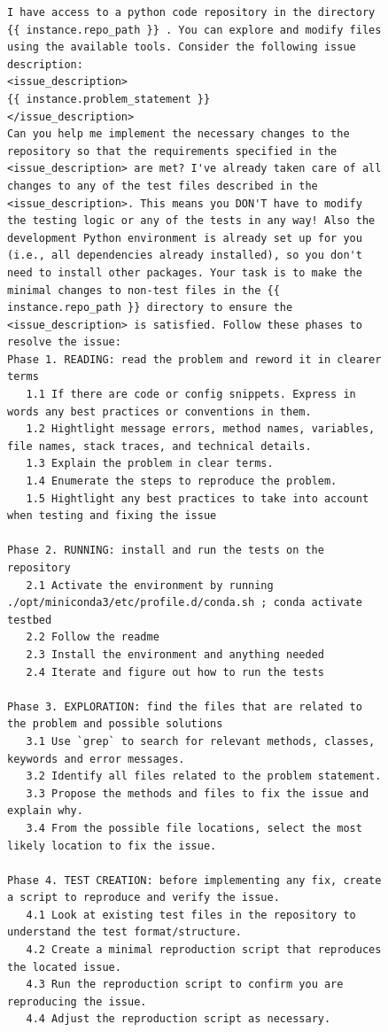 \begin{figure}[!h]
    \centering
\begin{tcolorbox}[colback=purple!6!white, colframe=purple!75!black, title={\small User Prompt for OpenHands Issue Resolution Agent (Vanilla Setting)}]
\begin{lstlisting}[basicstyle=\fontsize{7.7}{8}\ttfamily]
I have access to a python code repository in the directory {{ instance.repo_path }} . You can explore and modify files using the available tools. Consider the following issue description:
<issue_description>
{{ instance.problem_statement }}
</issue_description>
Can you help me implement the necessary changes to the repository so that the requirements specified in the <issue_description> are met? I've already taken care of all changes to any of the test files described in the <issue_description>. This means you DON'T have to modify the testing logic or any of the tests in any way! Also the development Python environment is already set up for you (i.e., all dependencies already installed), so you don't need to install other packages. Your task is to make the minimal changes to non-test files in the {{ instance.repo_path }} directory to ensure the <issue_description> is satisfied. Follow these phases to resolve the issue:
Phase 1. READING: read the problem and reword it in clearer terms
   1.1 If there are code or config snippets. Express in words any best practices or conventions in them.
   1.2 Hightlight message errors, method names, variables, file names, stack traces, and technical details.
   1.3 Explain the problem in clear terms.
   1.4 Enumerate the steps to reproduce the problem.
   1.5 Hightlight any best practices to take into account when testing and fixing the issue

Phase 2. RUNNING: install and run the tests on the repository
   2.1 Activate the environment by running   ./opt/miniconda3/etc/profile.d/conda.sh ; conda activate testbed
   2.2 Follow the readme
   2.3 Install the environment and anything needed
   2.4 Iterate and figure out how to run the tests

Phase 3. EXPLORATION: find the files that are related to the problem and possible solutions
   3.1 Use `grep` to search for relevant methods, classes, keywords and error messages.
   3.2 Identify all files related to the problem statement.
   3.3 Propose the methods and files to fix the issue and explain why.
   3.4 From the possible file locations, select the most likely location to fix the issue.

Phase 4. TEST CREATION: before implementing any fix, create a script to reproduce and verify the issue.
   4.1 Look at existing test files in the repository to understand the test format/structure.
   4.2 Create a minimal reproduction script that reproduces the located issue.
   4.3 Run the reproduction script to confirm you are reproducing the issue.
   4.4 Adjust the reproduction script as necessary.


\end{lstlisting}
\end{tcolorbox}
\end{figure}
